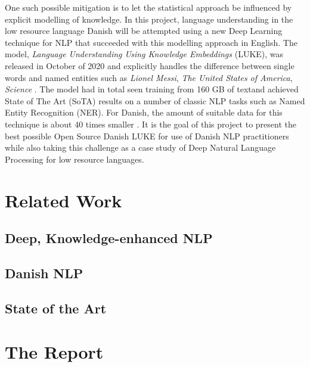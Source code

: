 \documentclass[main.tex]{subfiles}
\begin{document}
One such possible mitigation is to let the statistical approach be influenced by explicit modelling of knowledge.
In this project, language understanding in the low resource language Danish will be attempted using a new Deep Learning technique for NLP that succeeded with this modelling approach in English.
The model, \emph{Language Understanding Using Knowledge Embeddings} (LUKE), was released in October of 2020 and explicitly handles the difference between single words and named entities such as \emph{Lionel Messi}, \emph{The United States of America}, \emph{Science} \cite{yamada2020luke}.
The model had in total seen training from 160 GB of text\footnotemark and achieved State of The Art (SoTA) results on a number of classic NLP tasks such as Named Entity Recognition (NER).
For Danish, the amount of suitable data for this technique is about 40 times smaller \footnotemark.
It is the goal of this project to present the best possible Open Source Danish LUKE for use of Danish NLP practitioners while also taking this challenge as a case study of Deep Natural Language Processing for low resource languages.
\section{Related Work}
\subsection{Deep, Knowledge-enhanced NLP}
\subsection{Danish NLP}
\subsection{State of the Art}

\section{The Report}%
\label{sec:The Report}
\end{document}
